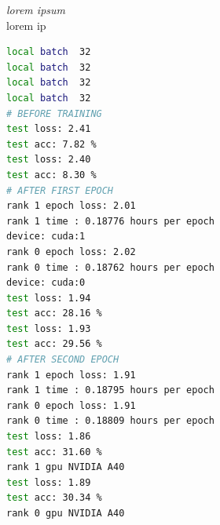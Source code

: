 \documentclass[12pt]{article}
\newcommand{\customtext}[3]{%
    \vspace{#2} %
    \fontsize{13}{8}\textcolor{#1}{\textit{#3}}%
}
\begin{document}
\pagebreak
\begin{figure}[!htb]
    \begin{minipage}[t]{0.65\textwidth}
    \raggedright
    \customtext{xtitle}{0em}{lorem ipsum}\\
        lorem ip
\begin{lstlisting}[language=bash, style=bash,basicstyle=\ttfamily\footnotesize]
local batch  32
local batch  32
local batch  32
local batch  32
# BEFORE TRAINING
test loss: 2.41
test acc: 7.82 %
test loss: 2.40
test acc: 8.30 %
# AFTER FIRST EPOCH
rank 1 epoch loss: 2.01
rank 1 time : 0.18776 hours per epoch
device: cuda:1
rank 0 epoch loss: 2.02
rank 0 time : 0.18762 hours per epoch
device: cuda:0
test loss: 1.94
test acc: 28.16 %
test loss: 1.93
test acc: 29.56 %
# AFTER SECOND EPOCH
rank 1 epoch loss: 1.91
rank 1 time : 0.18795 hours per epoch
rank 0 epoch loss: 1.91
rank 0 time : 0.18809 hours per epoch
test loss: 1.86
test acc: 31.60 %
rank 1 gpu NVIDIA A40
test loss: 1.89
test acc: 30.34 %
rank 0 gpu NVIDIA A40
\end{lstlisting}
\end{minipage}%
\hspace{25pt}
\begin{minipage}[t]{.4\textwidth}
  \raggedright
\end{minipage}
\end{figure}
\end{document}
